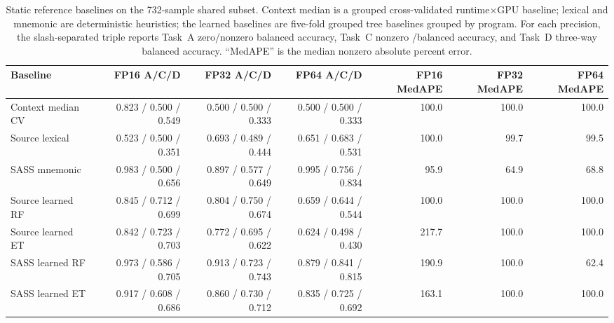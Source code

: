 \begin{table}[t]
  \centering
  \caption{Static reference baselines on the 732-sample shared subset. Context median is a grouped cross-validated runtime$\times$GPU baseline; lexical and mnemonic are deterministic heuristics; the learned baselines are five-fold grouped tree baselines grouped by program. For each precision, the slash-separated triple reports Task~A zero/nonzero balanced accuracy, Task~C nonzero \bandwidthbound/\computebound balanced accuracy, and Task~D three-way balanced accuracy. ``MedAPE'' is the median nonzero absolute percent error.}
  \label{tab:static-baselines}
  \scriptsize
  \setlength{\tabcolsep}{4pt}
  \begin{tabular}{lrrrrrr}
    Baseline & FP16 A/C/D & FP32 A/C/D & FP64 A/C/D & FP16 MedAPE & FP32 MedAPE & FP64 MedAPE \\
    \midrule
    Context median CV & 0.823 / 0.500 / 0.549 & 0.500 / 0.500 / 0.333 & 0.500 / 0.500 / 0.333 & 100.0 & 100.0 & 100.0 \\
    Source lexical & 0.523 / 0.500 / 0.351 & 0.693 / 0.489 / 0.444 & 0.651 / 0.683 / 0.531 & 100.0 & 99.7 & 99.5 \\
    SASS mnemonic & 0.983 / 0.500 / 0.656 & 0.897 / 0.577 / 0.649 & 0.995 / 0.756 / 0.834 & 95.9 & 64.9 & 68.8 \\
    Source learned RF & 0.845 / 0.712 / 0.699 & 0.804 / 0.750 / 0.674 & 0.659 / 0.644 / 0.544 & 100.0 & 100.0 & 100.0 \\
    Source learned ET & 0.842 / 0.723 / 0.703 & 0.772 / 0.695 / 0.622 & 0.624 / 0.498 / 0.430 & 217.7 & 100.0 & 100.0 \\
    SASS learned RF & 0.973 / 0.586 / 0.705 & 0.913 / 0.723 / 0.743 & 0.879 / 0.841 / 0.815 & 190.9 & 100.0 & 62.4 \\
    SASS learned ET & 0.917 / 0.608 / 0.686 & 0.860 / 0.730 / 0.712 & 0.835 / 0.725 / 0.692 & 163.1 & 100.0 & 100.0 \\
    \bottomrule
  \end{tabular}
\end{table}
